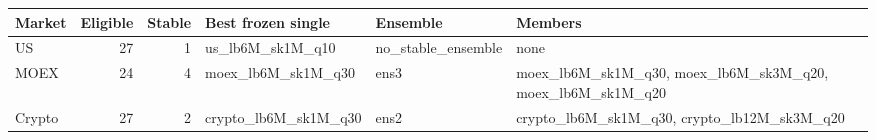 \scriptsize
\setlength{\tabcolsep}{5pt}
\begin{tabular}{lrrlll}
\toprule
Market & Eligible & Stable & Best frozen single & Ensemble & Members \\
\midrule
US & 27 & 1 & us\_lb6M\_sk1M\_q10 & no\_stable\_ensemble & none \\
MOEX & 24 & 4 & moex\_lb6M\_sk1M\_q30 & ens3 & moex\_lb6M\_sk1M\_q30, moex\_lb6M\_sk3M\_q20, moex\_lb6M\_sk1M\_q20 \\
Crypto & 27 & 2 & crypto\_lb6M\_sk1M\_q30 & ens2 & crypto\_lb6M\_sk1M\_q30, crypto\_lb12M\_sk3M\_q20 \\
\bottomrule
\end{tabular}
